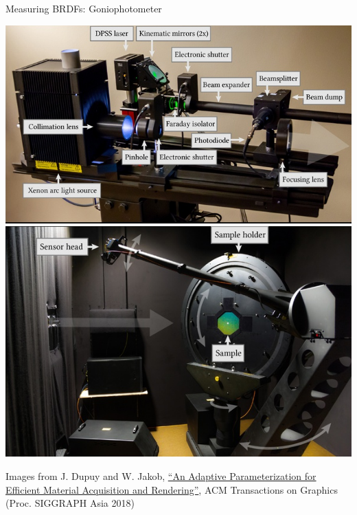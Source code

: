 \documentclass[utf8,stillsansserifmath,fleqn,t]{beamer}
\begin{document}
\begin{frame}[label=materials-measured]
\frametitle{\insertsection}
Measuring BRDFs: Goniophotometer\\
\begin{minipage}{.49\textwidth}
\includegraphics[width=\textwidth]{./fig/gonio1.png}\\
\includegraphics[width=\textwidth]{./fig/gonio2.png}
\end{minipage}\hfill
\begin{minipage}{.49\textwidth}
\tiny Images from  J. Dupuy and W. Jakob, \href{https://doi.org/10.1145/3272127.3275059}{``An Adaptive Parameterization for
Efficient Material Acquisition and Rendering''}, ACM Transactions on Graphics
(Proc. SIGGRAPH Asia 2018)
\end{minipage}
\end{frame}
\end{document}
